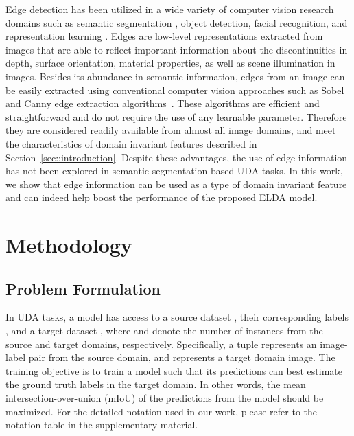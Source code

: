 \documentclass{bmvc2k}
\begin{document}
Edge detection has been utilized in a wide variety of computer vision research domains such as semantic segmentation \cite{chen2016semantic, JSENet}, object detection\cite{ferrari2007groups, lim2013sketch}, facial recognition\cite{Facial}, and representation learning \cite{chen2020simple}. Edges are low-level representations extracted from images that are able to reflect important information about the discontinuities in depth, surface orientation, material properties, as well as scene illumination in images. Besides its abundance in semantic information, edges from an image can be easily extracted using conventional computer vision approaches such as Sobel~\cite{sobel1998} and Canny edge extraction algorithms~\cite{canny1986}. These algorithms are efficient and straightforward and do not require the use of any learnable parameter. Therefore they are considered readily available from almost all image domains, and meet the characteristics of domain invariant features described in Section~\ref{sec::introduction}.  Despite these advantages, the use of edge information has not been explored in semantic segmentation based UDA tasks. In this work, we show that edge information can be used as a type of domain invariant feature and can indeed help boost the performance of the proposed 
ELDA model.













 


\section{Methodology}
\label{sec::methodology}
\subsection{Problem Formulation}
\label{subsec::problem_formulation}

In UDA tasks, a model has access to a source dataset , their corresponding labels , and a target dataset , where  and  denote the number of instances from the source and target domains, respectively. Specifically, a tuple  represents an image-label pair from the source domain, and  represents a target domain image. The training objective is to train a model such that its predictions can best estimate the ground truth labels in the target domain. In other words, the mean intersection-over-union (mIoU) of the predictions from the model should be maximized. For the detailed notation used in our work, please refer to the notation table in the supplementary material.
\end{document}
